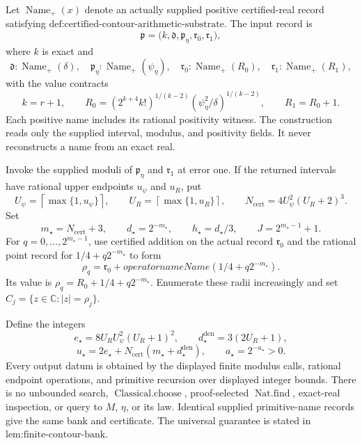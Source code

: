 Let \(\operatorname{Name}_{+}(x)\) denote an actually supplied positive certified-real record satisfying \(\text{def:certified-contour-arithmetic-substrate}\).  The input record is
\[
 \mathfrak p=
 \bigl(k,\mathfrak d,\mathfrak p_{\eta},\mathfrak r_0,\mathfrak r_1\bigr),
\]
where \(k\) is exact and
\[
 \mathfrak d:\operatorname{Name}_{+}(\delta),\quad
 \mathfrak p_{\eta}:\operatorname{Name}_{+}(\psi_{\eta}),\quad
 \mathfrak r_0:\operatorname{Name}_{+}(R_0),\quad
 \mathfrak r_1:\operatorname{Name}_{+}(R_1),
\]
with the value contracts
\[
 k=r+1,\qquad
 R_0=(2^{k+4}k!)^{1/(k-2)}
       (\psi_{\eta}^2/\delta)^{1/(k-2)},
 \qquad R_1=R_0+1.
\]
Each positive name includes its rational positivity witness.  The construction reads only the supplied interval, modulus, and positivity fields.  It never reconstructs a name from an exact real.

Invoke the supplied moduli of \(\mathfrak p_{\eta}\) and \(\mathfrak r_1\) at error one.  If the returned intervals have rational upper endpoints \(u_{\psi}\) and \(u_R\), put
\[
 U_{\psi}=\left\lceil\max\{1,u_{\psi}\}\right\rceil,
 \qquad
 U_R=\left\lceil\max\{1,u_R\}\right\rceil,
 \qquad
 N_{\mathrm{cert}}=4U_{\psi}^2(U_R+2)^3.
\]
Set
\[
 m_{\star}=N_{\mathrm{cert}}+3,
 \qquad d_{\star}=2^{-m_{\star}},
 \qquad h_{\star}=d_{\star}/3,
 \qquad J=2^{m_{\star}-1}+1.
\]
For \(q=0,\ldots,2^{m_{\star}-1}\), use certified addition on the actual record \(\mathfrak r_0\) and the rational point record for \(1/4+q2^{-m_{\star}}\) to form
\[
 \mathfrak\rho_q
 =\mathfrak r_0+operatorname{Name}(1/4+q2^{-m_{\star}}).
\]
Its value is \(\rho_q=R_0+1/4+q2^{-m_{\star}}\).  Enumerate these radii increasingly and set \(C_j=\{z\in\mathbb C:|z|=\rho_j\}\).

Define the integers
\[
 e_{\star}=8U_RU_{\psi}^2(U_R+1)^2,
 \qquad
 d_{\star}^{\mathrm{den}}=3(2U_R+1),
\]
\[
 u_{\star}=2e_{\star}
 +N_{\mathrm{cert}}(m_{\star}+d_{\star}^{\mathrm{den}}),
 \qquad
 a_{\star}=2^{-u_{\star}}>0.
\]
Every output datum is obtained by the displayed finite modulus calls, rational endpoint operations, and primitive recursion over displayed integer bounds.  There is no unbounded search, \(\operatorname{Classical.choose}\), proof-selected \(\operatorname{Nat.find}\), exact-real inspection, or query to \(M\), \(\eta\), or its law.  Identical supplied primitive-name records give the same bank and certificate.  The universal guarantee is stated in \(\text{lem:finite-contour-bank}\).
